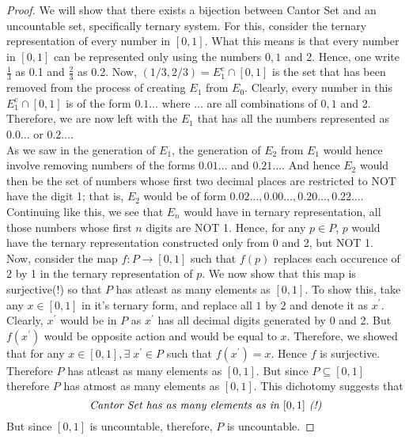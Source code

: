 \documentclass{article}
\theoremstyle{definition}
\theoremstyle{remark}
\theoremstyle{definition}
\theoremstyle{definition}
\theoremstyle{definition}
\newcommand{\intrs}{\cap}
\newcommand{\comp}[1]{#1^{\text{c}}}
\begin{document}
\begin{proof}
 We will show that there exists a bijection between Cantor Set and an uncountable set, specifically ternary system. For this, consider the ternary representation of every number in $ [0,1] $. What this means is that every number in $ [0,1] $ can be represented only using the numbers $ 0,1 $ and 2. Hence, one write $ \frac{1}{3} $ as 0.1 and $ \frac{2}{3} $ as 0.2. Now, $ (1/3,2/3) = \comp{E_1} \intrs [0,1] $ is the set that has been removed from the process of creating $ E_1 $ from $ E_0 $. Clearly, every number in this $ \comp{E_1}\intrs [0,1] $ is of the form $ 0.1 \dots $ where $ \dots $ are all combinations of $ 0,1 $ and 2. Therefore, we are now left with the $ E_1 $ that has all the numbers represented as $ 0.0\dots $ or $ 0.2\dots $. \\
 As we saw in the generation of $ E_1 $, the generation of $ E_2 $ from $ E_1 $ would hence involve removing numbers of the forms $ 0.01\dots $ and $ 0.21\dots $. And hence $ E_2 $ would then be the set of numbers whose first two decimal places are restricted to NOT have the digit 1; that is, $ E_2 $ would be of form $ 0.02\dots, 0.00\dots, 0.20\dots, 0.22\dots $.\\
 Continuing like this, we see that $ E_n $ would have in ternary representation, all those numbers whose first $ n $ digits are NOT 1. Hence, for any $ p \in P $, $ p $ would have the ternary representation constructed only from 0 and 2, but NOT 1.\\
 Now, consider the map $ f : P \to [0,1] $ such that $ f(p) $ replaces each occurence of $ 2 $ by 1 in the ternary representation of $ p $. We now show that this map is surjective(!) so that $ P $ has atleast as many elements as $ [0,1] $. To show this, take any $ x\in [0,1] $ in it's ternary form, and replace all $ 1 $ by $ 2 $ and denote it as $ x^\prime $. Clearly, $ x^\prime $ would be in $ P $ as $ x^{\prime} $ has all decimal digits generated by 0 and 2. But $ f(x^{\prime}) $ would be opposite action and would be equal to $ x $. Therefore, we showed that for any $ x\in [0,1],\exists\;x^{\prime} \in P$ such that $ f(x^{\prime}) = x $. Hence $ f $ is surjective. Therefore $ P $ has atleast as many elements as $ [0,1] $. But since $ P\subseteq [0,1] $ therefore $ P $ has atmost as many elements as $ [0,1] $. This dichotomy suggests that
 \[\text{\emph{Cantor Set has as many elements as in $ [0,1] $ (!)}}\]
 But since $ [0,1] $ is uncountable, therefore, $ P $ is uncountable.
\end{proof}
\hrulefill
\end{document}
